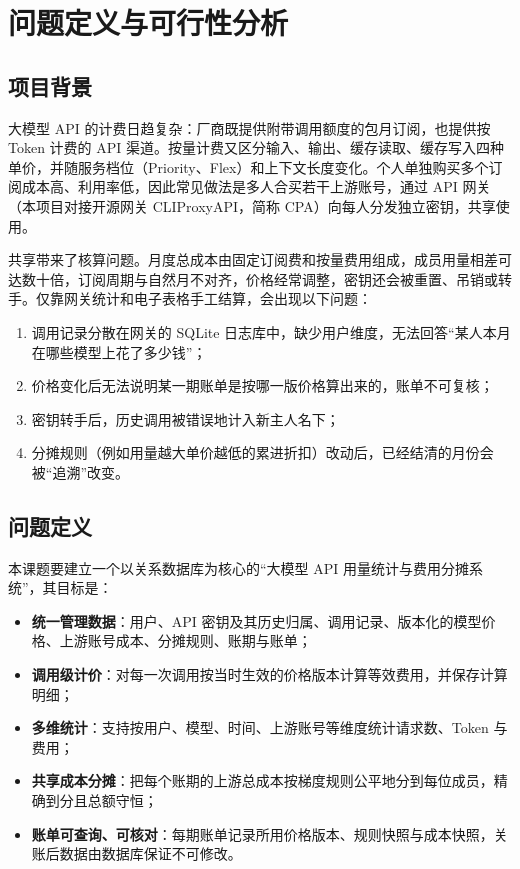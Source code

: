 \section{问题定义与可行性分析}

\subsection{项目背景}

大模型 API 的计费日趋复杂：厂商既提供附带调用额度的包月订阅，也提供按 Token 计费的 API 渠道。按量计费又区分输入、输出、缓存读取、缓存写入四种单价，并随服务档位（Priority、Flex）和上下文长度变化。个人单独购买多个订阅成本高、利用率低，因此常见做法是多人合买若干上游账号，通过 API 网关（本项目对接开源网关 CLIProxyAPI，简称 CPA）向每人分发独立密钥，共享使用。

共享带来了核算问题。月度总成本由固定订阅费和按量费用组成，成员用量相差可达数十倍，订阅周期与自然月不对齐，价格经常调整，密钥还会被重置、吊销或转手。仅靠网关统计和电子表格手工结算，会出现以下问题：
\begin{enumerate}
  \item 调用记录分散在网关的 SQLite 日志库中，缺少用户维度，无法回答“某人本月在哪些模型上花了多少钱”；
  \item 价格变化后无法说明某一期账单是按哪一版价格算出来的，账单不可复核；
  \item 密钥转手后，历史调用被错误地计入新主人名下；
  \item 分摊规则（例如用量越大单价越低的累进折扣）改动后，已经结清的月份会被“追溯”改变。
\end{enumerate}

\subsection{问题定义}

本课题要建立一个以关系数据库为核心的“大模型 API 用量统计与费用分摊系统”，其目标是：
\begin{itemize}
  \item \textbf{统一管理数据}：用户、API 密钥及其历史归属、调用记录、版本化的模型价格、上游账号成本、分摊规则、账期与账单；
  \item \textbf{调用级计价}：对每一次调用按当时生效的价格版本计算等效费用，并保存计算明细；
  \item \textbf{多维统计}：支持按用户、模型、时间、上游账号等维度统计请求数、Token 与费用；
  \item \textbf{共享成本分摊}：把每个账期的上游总成本按梯度规则公平地分到每位成员，精确到分且总额守恒；
  \item \textbf{账单可查询、可核对}：每期账单记录所用价格版本、规则快照与成本快照，关账后数据由数据库保证不可修改。
\end{itemize}

